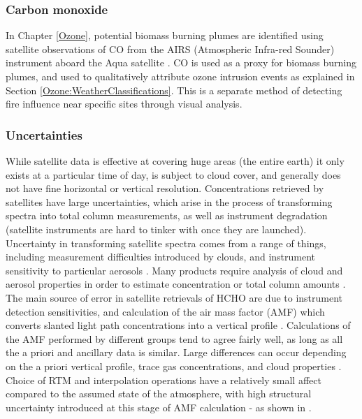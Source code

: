     \subsubsection{Carbon monoxide}
      \label{Model:datasets:AIRS}
      
      In Chapter \ref{Ozone}, potential biomass burning plumes are identified using satellite observations of CO from the AIRS (Atmospheric Infra-red Sounder) instrument aboard the Aqua satellite \parencite{AIRS3STD}.
      CO is used as a proxy for biomass burning plumes, and used to qualitatively attribute ozone intrusion events as explained in Section \ref{Ozone:WeatherClassifications}.
      This is a separate method of detecting fire influence near specific sites through visual analysis.
      
  
    \subsubsection{Uncertainties}
      
      While satellite data is effective at covering huge areas (the entire earth) it only exists at a particular time of day, is subject to cloud cover, and generally does not have fine horizontal or vertical resolution.
      Concentrations retrieved by satellites have large uncertainties, which arise in the process of transforming spectra into total column measurements, as well as instrument degradation (satellite instruments are hard to tinker with once they are launched).
      Uncertainty in transforming satellite spectra comes from a range of things, including measurement difficulties introduced by clouds, and instrument sensitivity to particular aerosols \parencite{Millet2006}.
      Many products require analysis of cloud and aerosol properties in order to estimate concentration or total column amounts \parencite{Palmer2001,Palmer2003, Marais2012, Vasilkov2017}.
      The main source of error in satellite retrievals of HCHO are due to instrument detection sensitivities, and calculation of the air mass factor (AMF) which converts slanted light path concentrations into a vertical profile \parencite{Millet2006}.
      Calculations of the AMF performed by different groups tend to agree fairly well, as long as all the a priori and ancillary data is similar.
      Large differences can occur depending on the a priori vertical profile, trace gas concentrations, and cloud properties \parencite{Lorente2017}.
      Choice of RTM and interpolation operations have a relatively small affect compared to the assumed state of the atmosphere, with high structural uncertainty introduced at this stage of AMF calculation - as shown in \textcite{Lorente2017}.
      
